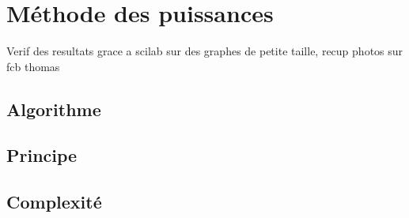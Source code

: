 \section{Méthode des puissances}
	Verif des resultats grace a scilab sur des graphes de petite taille, recup photos sur fcb thomas
	
	\subsection{Algorithme}
	\subsection{Principe}
	\subsection{Complexité}
